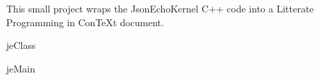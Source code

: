 \begintext

This small project wraps the JsonEchoKernel C++ code into a Litterate 
Programming in ConTeXt document.

\component jeClass

\component jeMain

\endtext